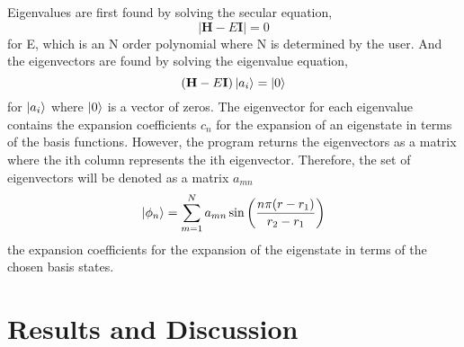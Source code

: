 \documentclass[12pt]{article}
\newcommand{\be}{\begin{equation}}
\newcommand{\ee}{\end{equation}}
\begin{document}
Eigenvalues are first found by solving the secular equation,
\be 
    |\textbf{H} - E \textbf{I}| = 0
\ee 
for E, which is an N order polynomial where N is determined by the user. And the eigenvectors are found by solving the eigenvalue equation,
\be 
    (\textbf{H} - E \textbf{I}) \ket{a_i} = \ket{0}
\ee 
for $\ket{a_i}$ where $\ket{0}$ is a vector of zeros. The eigenvector for each eigenvalue contains the expansion coefficients $c_n$ for the expansion of an eigenstate in terms of the basis functions. However, the program returns the eigenvectors as a matrix where the ith column represents the ith eigenvector. Therefore, the set of eigenvectors will be denoted as a matrix $a_{mn}$ 
\be 
    \ket{\phi_n} = \sum_{m = 1}^{N} a_{mn} \sin \left(\frac{n \pi (r - r_1)}{r_2 - r_1} \right)
\ee 
the expansion coefficients for the expansion of the eigenstate in terms of the chosen basis states.
\section{Results and Discussion}
\end{document}
